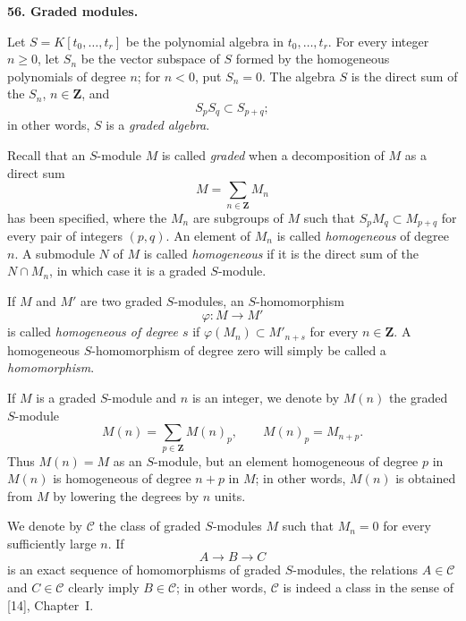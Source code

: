 
\label{fac:III:2:no:56}
\textbf{56. Graded modules.}

\label{fac:III:2:no:56:def:graded-algebra}
Let $S=K[t_0,\ldots,t_r]$ be the polynomial algebra in
$t_0,\ldots,t_r$. For every integer $n\geq0$, let $S_n$ be the vector
subspace of $S$ formed by the homogeneous polynomials of degree $n$; for
$n<0$, put $S_n=0$. The algebra $S$ is the direct sum of the $S_n$,
$n\in\mathbf{Z}$, and
\[
S_pS_q\subset S_{p+q};
\]
in other words, $S$ is a \textit{graded algebra}.

\label{fac:III:2:no:56:def:graded-module}
Recall that an $S$-module $M$ is called \textit{graded} when a decomposition
of $M$ as a direct sum
\[
M=\sum_{n\in\mathbf{Z}}M_n
\]
has been specified, where the $M_n$ are subgroups of $M$ such that
$S_pM_q\subset M_{p+q}$ for every pair of integers $(p,q)$. An element of
$M_n$ is called \textit{homogeneous} of degree $n$. A submodule $N$ of $M$
is called \textit{homogeneous} if it is the direct sum of the $N\cap M_n$,
in which case it is a graded $S$-module.

\label{fac:III:2:no:56:def:homogeneous-homomorphism}
If $M$ and $M'$ are two graded $S$-modules, an $S$-homomorphism
\[
\varphi:M\longrightarrow M'
\]
is called \textit{homogeneous of degree $s$} if
$\varphi(M_n)\subset M'_{n+s}$ for every $n\in\mathbf{Z}$. A homogeneous
$S$-homomorphism of degree zero will simply be called a
\textit{homomorphism}.

\label{fac:III:2:no:56:def:shift}
If $M$ is a graded $S$-module and $n$ is an integer, we denote by $M(n)$
the graded $S$-module
\[
M(n)=\sum_{p\in\mathbf{Z}}M(n)_p,
\qquad M(n)_p=M_{n+p}.
\]
Thus $M(n)=M$ as an $S$-module, but an element homogeneous of degree $p$ in
$M(n)$ is homogeneous of degree $n+p$ in $M$; in other words, $M(n)$ is
obtained from $M$ by lowering the degrees by $n$ units.

\label{fac:III:2:no:56:def:class-C}
We denote by $\mathcal{C}$ the class of graded $S$-modules $M$ such that
$M_n=0$ for every sufficiently large $n$. If
\[
A\longrightarrow B\longrightarrow C
\]
is an exact sequence of homomorphisms of graded $S$-modules, the relations
$A\in\mathcal{C}$ and $C\in\mathcal{C}$ clearly imply
$B\in\mathcal{C}$; in other words, $\mathcal{C}$ is indeed a class in the
sense of [14], Chapter~I.

